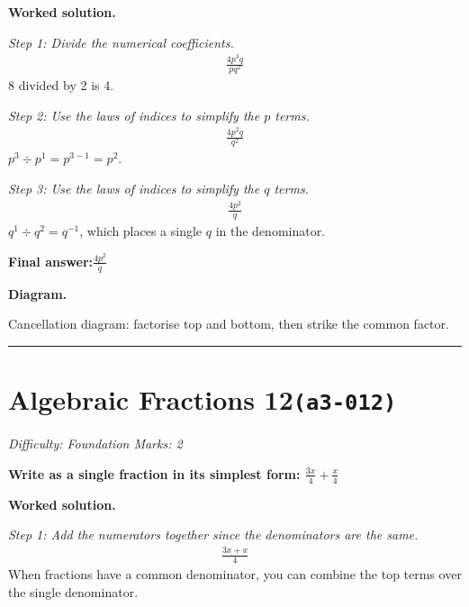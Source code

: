 \documentclass[11pt]{article}
\newcommand{\question}[1]{\par\medskip\noindent\textbf{#1}\par}
\begin{document}
\textbf{Worked solution.}

\textit{Step 1: Divide the numerical coefficients.}
\[\begin{gathered}
\frac{4p^3q}{pq^2}
\end{gathered}\]
8 divided by 2 is 4.

\textit{Step 2: Use the laws of indices to simplify the \( p \) terms.}
\[\begin{gathered}
\frac{4p^2q}{q^2}
\end{gathered}\]
\( p^3 \div p^1 = p^{3-1} = p^2 \).

\textit{Step 3: Use the laws of indices to simplify the \( q \) terms.}
\[\begin{gathered}
\frac{4p^2}{q}
\end{gathered}\]
\( q^1 \div q^2 = q^{-1} \), which places a single \( q \) in the denominator.

\begin{answerbox}
\textbf{Final answer:}\quad \(\displaystyle \frac{4p^2}{q}\)
\end{answerbox}
\textbf{Diagram.}

\begin{center}
\end{center}
\small Cancellation diagram: factorise top and bottom, then strike the common factor.\normalsize

\medskip\hrule

\section*{Algebraic Fractions 12\quad\small\texttt{(a3-012)}}
\textit{Difficulty: Foundation \quad\textbar\quad Marks: 2}

\question{Write as a single fraction in its simplest form: \( \frac{3x}{4} + \frac{x}{4} \)}

\textbf{Worked solution.}

\textit{Step 1: Add the numerators together since the denominators are the same.}
\[\begin{gathered}
\frac{3x + x}{4}
\end{gathered}\]
When fractions have a common denominator, you can combine the top terms over the single denominator.
\end{document}
